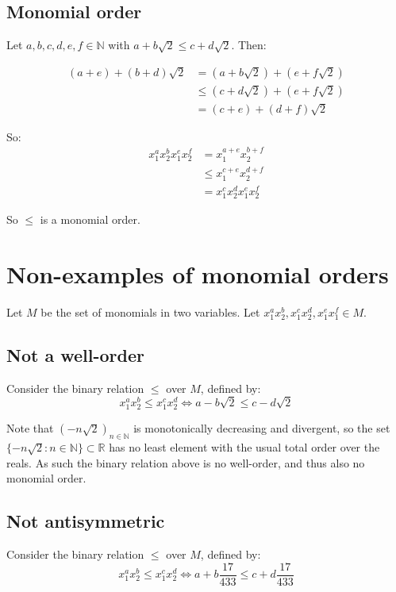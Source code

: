 \documentclass[a4paper]{scrreprt}
\begin{document}
\subsection{Monomial order}

Let $a, b, c, d, e, f \in \mathbb{N}$ with $a + b \sqrt{2} \leq c + d
\sqrt{2}$. Then:

\begin{align*}
		(a + e) + (b + d) \sqrt{2} & = (a + b \sqrt{2}) + (e + f \sqrt{2}) \\
								   & \leq (c + d \sqrt{2}) + (e + f \sqrt{2}) \\
								   & = (c + e) + (d + f) \sqrt{2}
\end{align*}

So:
\begin{align*}
		x_1^a x_2^b x_1^e x_2^f & = x_1^{a+e} x_2^{b+f} \\
								& \leq x_1^{c+e} x_2^{d+f} \\
								& = x_1^c x_2^d x_1^e x_2^f
\end{align*}

So $\leq$ is a monomial order.

\section{Non-examples of monomial orders}

Let $M$ be the set of monomials in two variables. Let $x_1^a x_2^b, x_1^c
x_2^d, x_1^e x_1^f \in M$.

\subsection{Not a well-order}

Consider the binary relation $\leq$ over $M$, defined by:
\[
		x_1^a x_2^b \leq x_1^c x_2^d \Leftrightarrow a - b \sqrt{2} \leq c - d \sqrt{2}
\]

Note that $(-n \sqrt{2})_{n \in \mathbb{N}}$ is monotonically decreasing and
divergent, so the set $\{-n \sqrt{2} : n \in \mathbb{N}\} \subset \mathbb{R}$
has no least element with the usual total order over the reals. As such the
binary relation above is no well-order, and thus also no monomial order.

\subsection{Not antisymmetric}


Consider the binary relation $\leq$ over $M$, defined by:
\[
		x_1^a x_2^b \leq x_1^c x_2^d \Leftrightarrow a + b \frac{17}{433} \leq c + d \frac{17}{433}
\]
\end{document}

